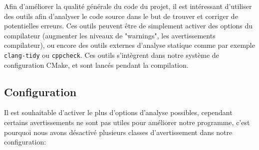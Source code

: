 Afin d'améliorer la qualité générale du code du projet, il est
intéressant d'utiliser des outils afin d'analyser le code source dans le
but de trouver et corriger de potentielles erreurs. Ces outils peuvent
être de simplement activer des options du compilateur (augmenter les
niveaux de "warnings", les avertissements compilateur), ou encore des
outils externes d'analyse statique comme par exemple \texttt{clang-tidy}
ou \texttt{cppcheck}. Ces outils s'intègrent dans notre système de
configuration CMake, et sont lancés pendant la compilation.

\subsection{Configuration}\label{configuration}

Il est souhaitable d'activer le plus d'options d'analyse possibles,
cependant certains avertissements ne sont pas utiles pour améliorer
notre programme, c'est pourquoi nous avons désactivé plusieurs classes
d'avertissement dans notre configuration:


